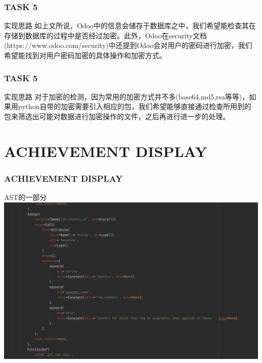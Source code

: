 \documentclass[10pt]{ctexbeamer}
\begin{document}
    \begin{frame}
        \frametitle{TASK 5}
        \begin{block}{实现思路}
            如上文所说，Odoo中的信息会储存于数据库之中，我们希望能检查其在存储到数据库的过程中是否经过加密。此外，Odoo在security文档(https://www.odoo.com/security)中还提到Odoo会对用户的密码进行加密，我们希望能找到对用户密码加密的具体操作和加密方式。
        \end{block}
    \end{frame}

    \begin{frame}
        \frametitle{TASK 5}
        \begin{block}{实现思路}
            对于加密的检测，因为常用的加密方式并不多(base64,md5,rsa等等)，如果用python自带的加密需要引入相应的包，我们希望能够直接通过检查所用到的包来筛选出可能对数据进行加密操作的文件，之后再进行进一步的处理。
        \end{block}
    \end{frame}

    \section{ACHIEVEMENT DISPLAY}
    \begin{frame}
        \frametitle{ACHIEVEMENT DISPLAY}
    
        \begin{block}{AST的一部分}
            \includegraphics[scale=0.268]{AST.png}
        \end{block}
    \end{frame}
\end{document}
